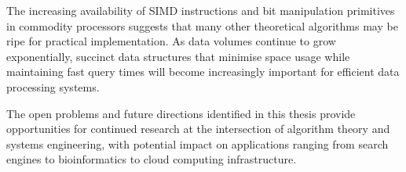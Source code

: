 The increasing availability of SIMD instructions and bit manipulation primitives in commodity processors suggests that many other theoretical algorithms may be ripe for practical implementation. As data volumes continue to grow exponentially, succinct data structures that minimise space usage while maintaining fast query times will become increasingly important for efficient data processing systems.

The open problems and future directions identified in this thesis provide opportunities for continued research at the intersection of algorithm theory and systems engineering, with potential impact on applications ranging from search engines to bioinformatics to cloud computing infrastructure.
